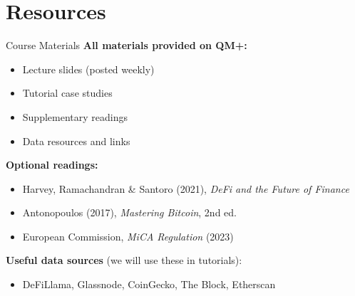\documentclass[10pt]{beamer}
\begin{document}
\section{Resources}

\begin{frame}{Course Materials}
  \textbf{All materials provided on QM+:}
  \begin{itemize}
    \item Lecture slides (posted weekly)
    \item Tutorial case studies
    \item Supplementary readings
    \item Data resources and links
  \end{itemize}
  
  \vspace{1em}
  \textbf{Optional readings:}
  \begin{itemize}
    \item Harvey, Ramachandran \& Santoro (2021), \textit{DeFi and the Future of Finance}
    \item Antonopoulos (2017), \textit{Mastering Bitcoin}, 2nd ed.
    \item European Commission, \textit{MiCA Regulation} (2023)
  \end{itemize}
  
  \vspace{1em}
  \textbf{Useful data sources} (we will use these in tutorials):
  \begin{itemize}
    \item DeFiLlama, Glassnode, CoinGecko, The Block, Etherscan
  \end{itemize}
\end{frame}
\end{document}
